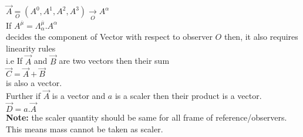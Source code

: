 \documentclass[11pt,a4paper]{article}
\begin{document}
\begin{enumerate}
\begin{enumerate}
\begin{enumerate}
                                    $\vec{A} \mathop = \limits^{}_{O} \left(A^0,A^1,A^2,A^3\right)\mathop \rightarrow \limits^{}_{O} {A^{\alpha}}$\\
                                    If $A^{\overline{\mu}}=\Lambda^{\overline{\mu}}_{\alpha}.A^{\alpha}$\\ decides the component of Vector with respect to observer $O$ then, it also requires linearity rules\\
                                    i.e If $\vec{A}$ and $\vec{B}$ are two vectors then their sum\\
                                    $\vec{C}=\vec{A}+\vec{B}$\\
                                    is also a vector.\\
                                    Further if $\vec{A}$ is a vector and $a$ is a scaler then their product is a vector.\\
                                    $\vec{D}=a.\vec{A}$\\
                                    \textbf{Note:} the scaler quantity should be same for all frame of reference/observers. This means mass cannot be taken as scaler.


\end{enumerate}
\end{enumerate}
\end{enumerate}
\end{document}
